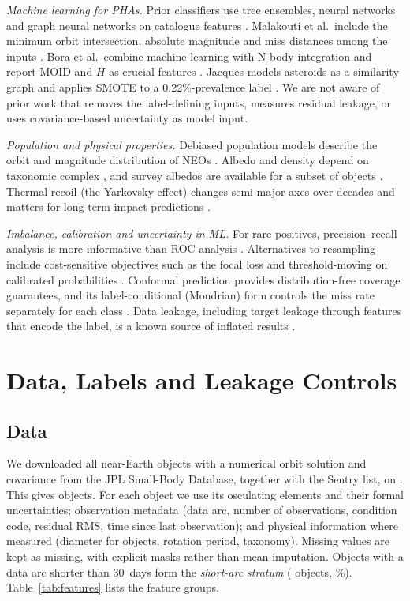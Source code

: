 \documentclass[journal]{IEEEtran}
\begin{document}
\emph{Machine learning for PHAs.} Prior classifiers use tree ensembles, neural networks and graph neural networks on catalogue features \cite{malakouti2023,bora2024,jacques2025,delina2024}. Malakouti et al.\ include the minimum orbit intersection, absolute magnitude and miss distances among the inputs \cite{malakouti2023}. Bora et al.\ combine machine learning with N-body integration and report MOID and $H$ as crucial features \cite{bora2024}. Jacques models asteroids as a similarity graph and applies SMOTE to a 0.22\%-prevalence label \cite{jacques2025}. We are not aware of prior work that removes the label-defining inputs, measures residual leakage, or uses covariance-based uncertainty as model input.

\emph{Population and physical properties.} Debiased population models describe the orbit and magnitude distribution of NEOs \cite{granvik2018}. Albedo and density depend on taxonomic complex \cite{thomas2011,carry2012}, and survey albedos are available for a subset of objects \cite{mainzer2011}. Thermal recoil (the Yarkovsky effect) changes semi-major axes over decades and matters for long-term impact predictions \cite{bottke2006}.

\emph{Imbalance, calibration and uncertainty in ML.} For rare positives, precision--recall analysis is more informative than ROC analysis \cite{davis2006,saito2015}. Alternatives to resampling include cost-sensitive objectives such as the focal loss \cite{lin2017} and threshold-moving on calibrated probabilities \cite{platt1999}. Conformal prediction provides distribution-free coverage guarantees, and its label-conditional (Mondrian) form controls the miss rate separately for each class \cite{vovk2005,angelopoulos2023}. Data leakage, including target leakage through features that encode the label, is a known source of inflated results \cite{kaufman2012}.

\section{Data, Labels and Leakage Controls}\label{sec:data}
\subsection{Data}
We downloaded all near-Earth objects with a numerical orbit solution and covariance from the JPL Small-Body Database, together with the Sentry list, on \SnapshotDate{} \cite{jplsbdb}. This gives \NObj{} objects. For each object we use its osculating elements and their formal uncertainties; observation metadata (data arc, number of observations, condition code, residual RMS, time since last observation); and physical information where measured (diameter for \NDiam{} objects, rotation period, taxonomy). Missing values are kept as missing, with explicit masks rather than mean imputation. Objects with a data arc shorter than 30~days form the \emph{short-arc stratum} (\NShortArc{} objects, \PctShortArc\%). Table~\ref{tab:features} lists the feature groups.
\end{document}
